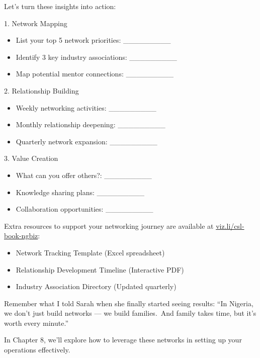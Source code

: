 Let's turn these insights into action:

1. Network Mapping
\begin{itemize}
    \item List your top 5 network priorities: \_\_\_\_\_\_\_\_\_
    \item Identify 3 key industry associations: \_\_\_\_\_\_\_\_\_
    \item Map potential mentor connections: \_\_\_\_\_\_\_\_\_
\end{itemize}

2. Relationship Building
\begin{itemize}
    \item Weekly networking activities: \_\_\_\_\_\_\_\_\_
    \item Monthly relationship deepening: \_\_\_\_\_\_\_\_\_
    \item Quarterly network expansion: \_\_\_\_\_\_\_\_\_
\end{itemize}

3. Value Creation
\begin{itemize}
    \item What can you offer others?: \_\_\_\_\_\_\_\_\_
    \item Knowledge sharing plans: \_\_\_\_\_\_\_\_\_
    \item Collaboration opportunities: \_\_\_\_\_\_\_\_\_
\end{itemize}

Extra resources to support your networking journey are available at \href{https://viz.li/csl-book-ngbiz}{viz.li/csl-book-ngbiz}:
\begin{itemize}
    \item Network Tracking Template (Excel spreadsheet)
    \item Relationship Development Timeline (Interactive PDF)
    \item Industry Association Directory (Updated quarterly)
\end{itemize}

Remember what I told Sarah when she finally started seeing results: ``In Nigeria, we don't just build networks --- we build families.\ And family takes time, but it's worth every minute.''

In Chapter 8, we'll explore how to leverage these networks in setting up your operations effectively.